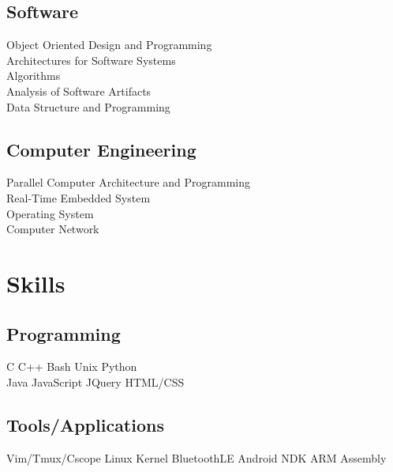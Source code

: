 \documentclass[hidelinks,letterpaper]{deedy-resume} %
\begin{document}
\begin{minipage}[t]{0.35\textwidth}
\subsection{Software}
Object Oriented Design and Programming \\
Architectures for Software Systems \\
Algorithms \\
Analysis of Software Artifacts \\
Data Structure and Programming \\

\sectionspace
\subsection{Computer Engineering}
Parallel Computer Architecture and Programming \\
Real-Time Embedded System \\
Operating System \\
Computer Network \\

\sectionspace


\section{Skills}

\subsection{Programming}
C \textbullet{} C++ \textbullet{} Bash \textbullet{}
Unix \textbullet{} Python \\
Java \textbullet{} JavaScript \textbullet{}
JQuery \textbullet{} HTML/CSS \\
\sectionspace

\subsection{Tools/Applications}
Vim/Tmux/Cscope \textbullet{} Linux Kernel \textbullet{}
BluetoothLE \textbullet{} Android NDK \textbullet{}
ARM \textbullet{} Assembly \\


\end{minipage}
\end{document}
